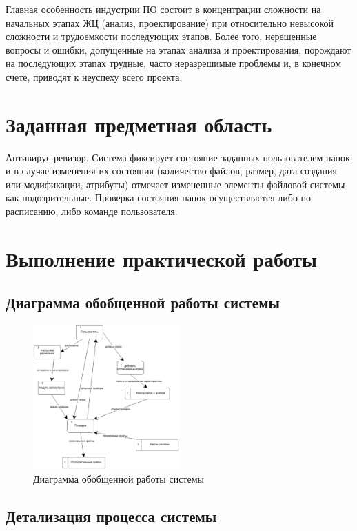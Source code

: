 Главная особенность индустрии ПО состоит в концентрации сложности на начальных этапах ЖЦ (анализ, проектирование) при относительно невысокой сложности и трудоемкости последующих этапов. Более того, нерешенные вопросы и ошибки, допущенные на этапах анализа и проектирования, порождают на последующих этапах трудные, часто неразрешимые проблемы и, в конечном счете, приводят к неуспеху всего проекта.
\section{Заданная предметная область}

Антивирус-ревизор. Система фиксирует состояние заданных пользователем папок и в случае изменения их состояния (количество файлов, размер, дата создания или модификации, атрибуты) отмечает измененные элементы файловой системы как подозрительные. Проверка состояния папок осуществляется либо по расписанию, либо команде пользователя.

\section{Выполнение практической работы}

\subsection{Диаграмма обобщенной работы системы}

\begin{figure}[h!]
	\centering
	\includegraphics[width=0.5\textwidth]{images/2/total.eps}
	\caption{Диаграмма обобщенной работы системы}
\end{figure}

\subsection{Детализация процесса системы}

